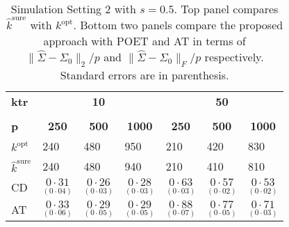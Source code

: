 \documentclass[11pt,oneside]{amsart}
\begin{document}
\begin{table}[htbp!]
\footnotesize
\caption{Simulation Setting 2 with $s = 0.5$. Top panel compares $\widehat{k}^{\text{sure}}$ with $k^{\text{opt}}$. Bottom two panels compare the proposed approach with POET and AT in terms of $\|{\widehat{\Sigma}} - {\Sigma_0}\|_{2}/p$ and $\|{\widehat{\Sigma}} - {\Sigma_0}\|_{F}/p$ respectively. Standard errors are in parenthesis.} \label{table3}
\begin{multicols}{7}
\centering
\begin{tabular}{|p{1.92cm}|p{1.92cm}|p{1.92cm}|p{1.92cm}|p{1.92cm}|p{1.92cm}|p{1.92cm}|} \toprule
{\bf ktr} & \multicolumn{3}{c}{{\bf{10}}}& \multicolumn{3}{c|}{{\bf{50}}} \\
\cmidrule(lr){2-4} \cmidrule(lr){5-7} \\
{\bf p} & \multicolumn{1}{c}{{\bf 250}} & \multicolumn{1}{c}{{\bf 500}} & \multicolumn{1}{c}{{\bf 1000}} & \multicolumn{1}{c}{{\bf 250}} & \multicolumn{1}{c}{{\bf 500}} & \multicolumn{1}{c|}{{\bf 1000}}\\
\hline
${k^{\text{opt}}}$ & 240 & 480 & 950 & 210 & 420 & 830 \\  
${\widehat{k}}^{\text{sure}}$ & 240 & 480 & 940 & 210 & 410 & 810 \\  \hline \hline 
CD & ${\underset{(0\cdot04)}{0\cdot31}}$ & ${\underset{(0\cdot03)}{0\cdot26}}$ & ${\underset{(0\cdot03)}{0\cdot28}}$ & ${\underset{(0\cdot03)}{0\cdot63}}$ & ${\underset{(0\cdot02)}{0\cdot57}}$ & ${\underset{(0\cdot02)}{0\cdot53}}$ \\  
AT & ${\underset{(0\cdot06)}{0\cdot33}}$ & ${\underset{(0\cdot05)}{0\cdot29}}$ & ${\underset{(0\cdot05)}{0\cdot29}}$ & ${\underset{(0\cdot07)}{0\cdot88}}$ & ${\underset{(0\cdot05)}{0\cdot77}}$ & ${\underset{(0\cdot03)}{0\cdot71}}$ \\ 

\end{tabular}
\end{multicols}
\end{table}
\end{document}
